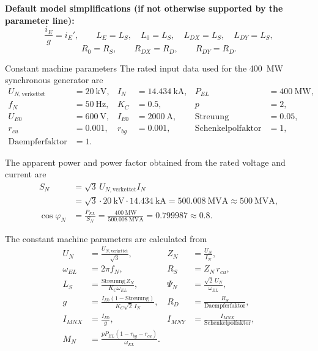 \begin{noteBox}
	\textbf{Default model simplifications (if not otherwise supported by the parameter line):}
	\[
	\frac{i_E}{g}=i_E',\qquad
	L_E=L_S,\quad L_0=L_S,\quad L_{DX}=L_S,\quad L_{DY}=L_S,
	\]
	\[
	R_0=R_S,\qquad R_{DX}=R_D,\qquad R_{DY}=R_D.
	\]
\end{noteBox}

\thispagestyle{scrheadings}

\begin{formulaBox}{Constant machine parameters}
	The rated input data used for the \SI{400}{\mega\watt} synchronous generator are
	\begin{align}
		U_{N,\mathrm{verkettet}}&=\SI{20}{\kilo\volt}, &
		I_N&=\SI{14.434}{\kilo\ampere}, &
		P_{EL}&=\SI{400}{\mega\watt},\\
		f_N&=\SI{50}{\hertz}, &
		K_C&=0.5, &
		p&=2,\\
		U_{E0}&=\SI{600}{\volt}, &
		I_{E0}&=\SI{2000}{\ampere}, &
		\mathrm{Streuung}&=0.05,\\
		r_{cu}&=0.001, &
		r_{bg}&=0.001, &
		\mathrm{Schenkelpolfaktor}&=1,\\
		\mathrm{Daempferfaktor}&=1. &&&
	\end{align}
	
	The apparent power and power factor obtained from the rated voltage and current
	are
	\begin{align}
		S_N
		&=\sqrt{3}\,U_{N,\mathrm{verkettet}}I_N\\
		&=\sqrt{3}\cdot\SI{20}{\kilo\volt}
		\cdot\SI{14.434}{\kilo\ampere}
		=\SI{500.008}{\mega\volt\ampere}
		\approx\SI{500}{\mega\volt\ampere},\\
		\cos\varphi_N
		&=\frac{P_{EL}}{S_N}
		=\frac{\SI{400}{\mega\watt}}
		{\SI{500.008}{\mega\volt\ampere}}
		=0.799987\approx0.8.
	\end{align}
	
	The constant machine parameters are calculated from
	\begin{align}
		U_N &= \frac{U_{N,\mathrm{verkettet}}}{\sqrt{3}}, &
		Z_N &= \frac{U_N}{I_N}, \\
		\omega_{EL} &= 2\pi f_N, &
		R_S &= Z_N\,r_{cu}, \\
		L_S &= \frac{\mathrm{Streuung}\,Z_N}{K_C\omega_{EL}}, &
		\Psi_N &= \frac{\sqrt{2}\,U_N}{\omega_{EL}}, \\
		g &= \frac{I_{E0}(1-\mathrm{Streuung})}
		{K_C\sqrt{2}\,I_N}, &
		R_D &= \frac{R_S}{\mathrm{Daempferfaktor}}, \\
		I_{MNX} &= \frac{I_{E0}}{g}, &
		I_{MNY} &= \frac{I_{MNX}}{\mathrm{Schenkelpolfaktor}}, \\
		M_N &= \frac{pP_{EL}(1-r_{bg}-r_{cu})}{\omega_{EL}}. &&
	\end{align}
	

\end{formulaBox}
